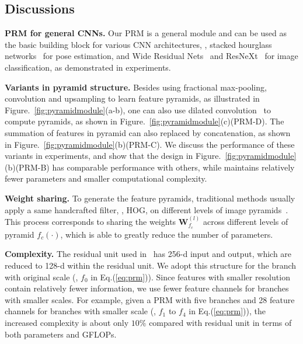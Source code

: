 \documentclass[10pt,twocolumn,letterpaper]{article}
\newcommand{\smalltitle}[1]{\vspace{0.2em}\noindent \textbf{{#1}}}
\newcommand{\W}{\mathbf{W}}
\begin{document}
\subsection{Discussions} 

\smalltitle{PRM for general CNNs. } Our PRM is a general  module and can be used as the basic building block for various CNN architectures, \eg, stacked hourglass networks~\cite{newell2016stacked} for pose estimation, and Wide Residual Nets~\cite{zagoruyko2016WRN} and ResNeXt~\cite{xie2016aggregated} for image classification, as demonstrated in experiments.


\smalltitle{Variants in pyramid structure. } Besides using fractional max-pooling, convolution and upsampling to learn feature pyramids, as illustrated in Figure.~\ref{fig:pyramidmodule}(a-b), one can also use dilated convolution~\cite{chen2016deeplab,yu2016multi} to compute pyramids, as shown in Figure.~\ref{fig:pyramidmodule}(c)(PRM-D). 
The summation of features in pyramid can also replaced by concatenation, as shown in Figure.~\ref{fig:pyramidmodule}(b)(PRM-C). 
We discuss the performance of these variants in experiments, and show that the design in Figure.~\ref{fig:pyramidmodule}(b)(PRM-B) has comparable performance with others, while maintains relatively fewer parameters and smaller computational complexity.  

\smalltitle{Weight sharing. }
To generate the feature pyramids, traditional methods usually apply a same handcrafted filter, \eg, HOG, on different levels of image pyramids~\cite{adelson1984pyramid,felzenszwalb2010object}. 
This process corresponds to sharing the weights $\W^{(l)}_{f_c}$ across different levels of pyramid $f_c(\cdot)$, which is able to greatly reduce the number of parameters.

\smalltitle{Complexity. }
The residual unit used in~\cite{newell2016stacked} has 256-d input and output, which are reduced to 128-d within the residual unit. 
We adopt this structure for the branch with original scale (\ie, $f_0$ in Eq.(\ref{eq:prm})). 
Since features with smaller resolution contain relatively fewer information, we use fewer feature channels for branches with smaller scales. 
For example, given a PRM with five branches and 28 feature channels for branches with smaller scale (\ie, $f_1$ to $f_4$ in Eq.(\ref{eq:prm})), the increased complexity is about only $10\%$ compared with residual unit in terms of both parameters and GFLOPs. 
\end{document}
